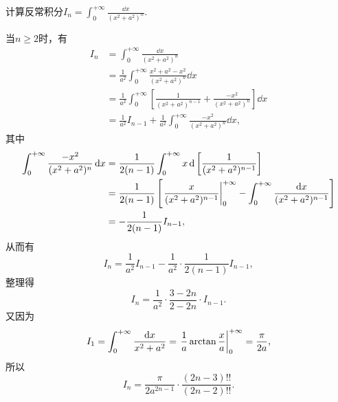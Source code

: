 \begin{example}
计算反常积分\(I_n = \int_0^{+\infty} \frac{\dd{x}}{(x^2+a^2)^n}\).
\begin{solution}
当\(n\geq2\)时，有\begin{align*}
	I_n &= \int_0^{+\infty} \frac{\dd{x}}{(x^2+a^2)^n} \\
	&= \frac1{a^2} \int_0^{+\infty} \frac{x^2+a^2-x^2}{(x^2+a^2)^n} \dd{x} \\
	&= \frac1{a^2} \int_0^{+\infty} \left[
		\frac1{(x^2+a^2)^{n-1}}
		+ \frac{-x^2}{(x^2+a^2)^n}
	\right] \dd{x} \\
	&= \frac1{a^2} I_{n-1}
		+ \frac1{a^2} \int_0^{+\infty} \frac{-x^2}{(x^2+a^2)^n} \dd{x},
\end{align*}
其中\begin{align*}
	\int_0^{+\infty} \frac{-x^2}{(x^2+a^2)^n} \dd{x}
	&= \frac1{2(n-1)} \int_0^{+\infty} x \dd{\left[\frac1{(x^2+a^2)^{n-1}}\right]} \\
	&= \frac1{2(n-1)} \left[
		\eval{\frac{x}{(x^2+a^2)^{n-1}}}_0^{+\infty}
		- \int_0^{+\infty} \frac{\dd{x}}{(x^2+a^2)^{n-1}}
	\right] \\
	&= -\frac1{2(n-1)} I_{n-1},
\end{align*}
从而有\begin{equation*}
	I_n = \frac1{a^2} I_{n-1} - \frac1{a^2} \cdot \frac1{2(n-1)} I_{n-1},
\end{equation*}
整理得\begin{equation*}
	I_n = \frac1{a^2} \cdot \frac{3-2n}{2-2n} \cdot I_{n-1}.
\end{equation*}
又因为\begin{equation*}
	I_1 = \int_0^{+\infty} \frac{\dd{x}}{x^2+a^2}
	= \eval{\frac1a \arctan\frac{x}{a}}_0^{+\infty}
	= \frac\pi{2a},
\end{equation*}
所以\begin{equation*}
	I_n = \frac\pi{2a^{2n-1}} \cdot \frac{(2n-3)!!}{(2n-2)!!}.
\end{equation*}
\end{solution}
\end{example}

